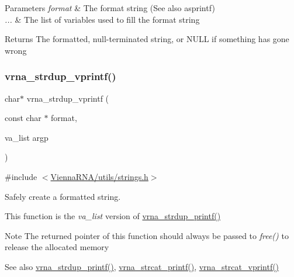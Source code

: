 \begin{DoxyParams}{Parameters}
{\em format} & The format string (See also asprintf) \\
\hline
{\em ...} & The list of variables used to fill the format string \\
\hline
\end{DoxyParams}
\begin{DoxyReturn}{Returns}
The formatted, null-\/terminated string, or N\+U\+LL if something has gone wrong 
\end{DoxyReturn}
\mbox{\label{group__string__utils_ga459fdee190ed81bb7773cbaf671748a9}} 
\subsubsection{\texorpdfstring{vrna\+\_\+strdup\+\_\+vprintf()}{vrna\_strdup\_vprintf()}}
{\footnotesize\ttfamily char$\ast$ vrna\+\_\+strdup\+\_\+vprintf (\begin{DoxyParamCaption}\item[{const char $\ast$}]{format,  }\item[{va\+\_\+list}]{argp }\end{DoxyParamCaption})}



{\ttfamily \#include $<$\hyperlink{strings_8h}{Vienna\+R\+N\+A/utils/strings.\+h}$>$}



Safely create a formatted string. 

This function is the {\itshape va\+\_\+list} version of \hyperlink{group__string__utils_ga33cc0190a326ec368277caa777b8bf18}{vrna\+\_\+strdup\+\_\+printf()}

\begin{DoxyNote}{Note}
The returned pointer of this function should always be passed to {\itshape free()} to release the allocated memory
\end{DoxyNote}
\begin{DoxySeeAlso}{See also}
\hyperlink{group__string__utils_ga33cc0190a326ec368277caa777b8bf18}{vrna\+\_\+strdup\+\_\+printf()}, \hyperlink{group__string__utils_gac0771ec71316023067f2aae61a5aa0fb}{vrna\+\_\+strcat\+\_\+printf()}, \hyperlink{group__string__utils_ga122df216996ba62fd5056b7743e3131a}{vrna\+\_\+strcat\+\_\+vprintf()}
\end{DoxySeeAlso}

